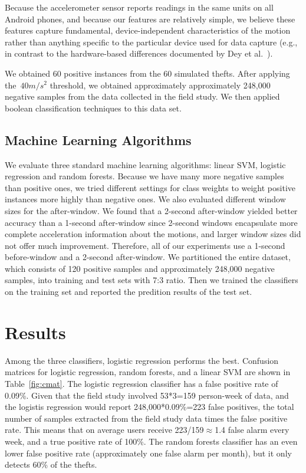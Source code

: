 Because the accelerometer sensor reports readings in the same units on all Android phones, and because our features are relatively simple, we believe these features capture fundamental, device-independent characteristics of the motion rather than anything specific to the particular device used for data capture (e.g., in contrast to the hardware-based differences documented by Dey et al.~\cite{Dey2014}).

We obtained 60 positive instances from the 60 simulated thefts.
After applying the~$40 m/s^2$ threshold, we obtained approximately approximately 248,000 negative samples from the data collected in the field study. 
We then applied boolean classification techniques to this data set.





\subsection{Machine Learning Algorithms}
We evaluate three standard machine learning algorithms: linear SVM, logistic regression and random forests.
Because we have many more negative samples than positive ones, we tried different settings for class weights to weight positive instances more highly than negative ones.
We also evaluated different window sizes for the after-window.
We found that a 2-second after-window yielded better accuracy than a 1-second after-window since 2-second windows encapsulate more complete acceleration information about the motions, and larger window sizes did not offer much improvement.
Therefore, all of our experiments use a 1-second before-window and a 2-second after-window.
We partitioned the entire dataset, which consists of 120 positive samples and approximately 248,000 negative samples, into training and test sets with 7:3 ratio.
Then we trained the classifiers on the training set and reported the predition results of the test set.



\section{Results}
Among the three classifiers, logistic regression performs the best.
Confusion matrices for logistic regression, random forests, and a linear SVM
are shown in Table~\ref{fig:cmat}.
The logistic regression classifier has a false positive rate of 0.09\%. Given that the field study involved 53*3=159 person-week of data, and the logistis regression would report 248,000*0.09\%=223 false positives, the total number of samples extracted from the field study data times the false positive rate. This means that on average users receive 223/159$\approx$1.4 false alarm every week, and a true positive rate of 100\%.
The random forests classifier has an even lower false positive rate (approximately one false alarm per month),
but it only detects 60\% of the thefts.

